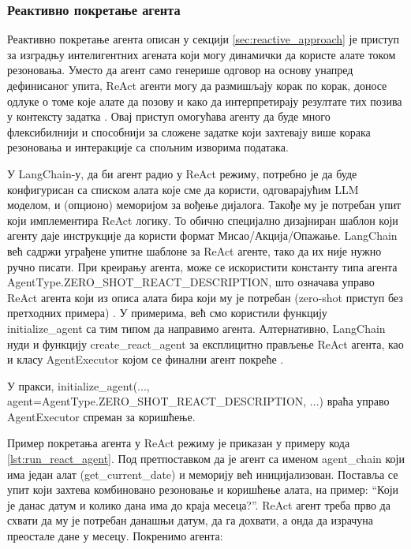 \subsubsection{Реактивно покретање агента}

Реактивно покретање агента описан у секцији \ref{sec:reactive_approach} је приступ за изградњу интелигентних агената који могу динамички да користе алате током резоновања. Уместо да агент само генерише одговор на основу унапред дефинисаног упита, ReAct агенти могу да размишљају корак по корак, доносе одлуке о томе које алате да позову и како да интерпретирају резултате тих позива у контексту задатка \cite{yao_react_2022}. Овај приступ омогућава агенту да буде много флексибилнији и способнији за сложене задатке који захтевају више корака резоновања и интеракције са спољним изворима података.

У LangChain-у, да би агент радио у ReAct режиму, потребно је да буде конфигурисан са списком алата које сме да користи, одговарајућим LLM моделом, и (опционо) меморијом за вођење дијалога. Такође му је потребан упит који имплементира ReAct логику. То обично специјално дизајниран шаблон који агенту даје инструкције да користи формат Мисао/Акција/Опажање. LangChain већ садржи уграђене упитне шаблоне за ReAct агенте, тако да их није нужно ручно писати. При креирању агента, може се искористити константу типа агента AgentType.ZERO\_SHOT\_REACT\_DESCRIPTION, што означава управо ReAct агента који из описа алата бира који му је потребан (zero-shot приступ без претходних примера) \cite{langchain_docs_2024}. У примерима, већ смо користили функцију initialize\_agent са тим типом да направимо агента. Алтернативно, LangChain нуди и функцију create\_react\_agent за експлицитно прављење ReAct агента, као и класу AgentExecutor којом се финални агент покреће \cite{langchain_docs_2024}. 

У пракси, initialize\_agent(..., agent=AgentType.ZERO\_SHOT\_REACT\_DESCRIPTION, ...) враћа управо AgentExecutor спреман за коришћење.
\newline

Пример покретања агента у ReAct режиму је приказан у примеру кода \ref{lst:run_react_agent}. Под претпоставком да је агент са именом agent\_chain који има један алат (get\_current\_date) и меморију већ иницијализован. Поставља се упит који захтева комбиновано резоновање и коришћење алата, на пример: ``Који је данас датум и колико дана има до краја месеца?''. ReAct агент треба прво да схвати да му је потребан данашњи датум, да га дохвати, а онда да израчуна преостале дане у месецу. Покренимо агента:

